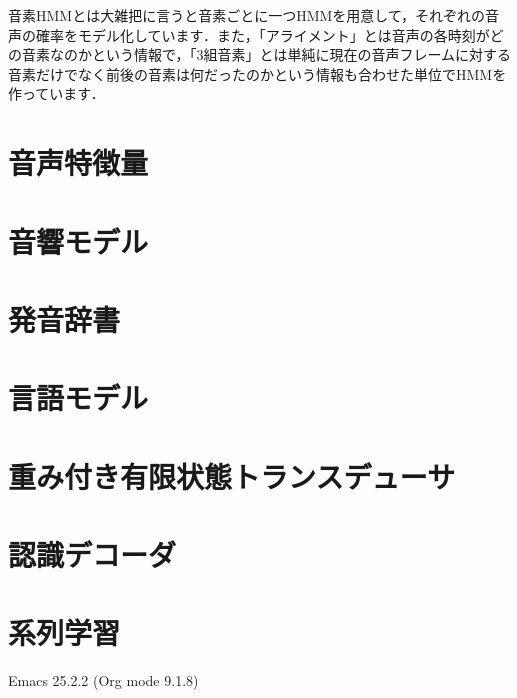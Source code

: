 \documentclass[11pt]{article}
\begin{document}
音素HMMとは大雑把に言うと音素ごとに一つHMMを用意して，それぞれの音声の確率をモデル化しています．また，「アライメント」とは音声の各時刻がどの音素なのかという情報で，「3組音素」とは単純に現在の音声フレームに対する音素だけでなく前後の音素は何だったのかという情報も合わせた単位でHMMを作っています．

\section{音声特徴量}
\label{sec:orgd707ae9}



\section{音響モデル}
\label{sec:org206c406}

\section{発音辞書}
\label{sec:org4bb10ed}

\section{言語モデル}
\label{sec:org1bd328a}

\section{重み付き有限状態トランスデューサ}
\label{sec:org820d8b7}

\section{認識デコーダ}
\label{sec:orgdd63bfd}

\section{系列学習}
\label{sec:orgc2791c7}




Emacs 25.2.2 (Org mode 9.1.8)
\end{document}
